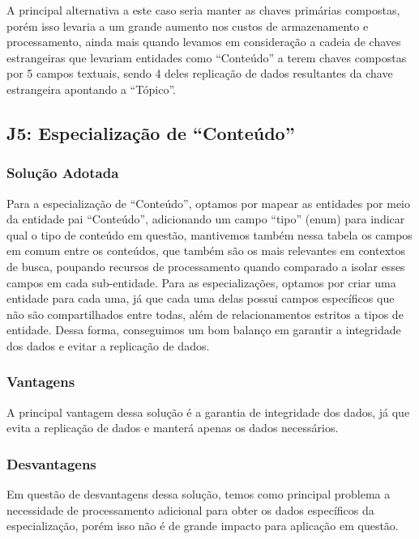 A principal alternativa a este caso seria manter as chaves primárias compostas,
porém isso levaria a um grande aumento nos custos de armazenamento e
processamento, ainda mais quando levamos em consideração a cadeia de chaves
estrangeiras que levariam entidades como ``Conteúdo'' a terem chaves compostas
por 5 campos textuais, sendo 4 deles replicação de dados resultantes da chave
estrangeira apontando a ``Tópico''.

\subsection{\textbf{J5:} Especialização de ``Conteúdo''}

\subsubsection{Solução Adotada}

Para a especialização de ``Conteúdo'', optamos por mapear as entidades por meio
da entidade pai ``Conteúdo'', adicionando um campo ``tipo'' (enum) para indicar
qual o tipo de conteúdo em questão, mantivemos também nessa tabela os campos em
comum entre os conteúdos, que também são os mais relevantes em contextos de
busca, poupando recursos de processamento quando comparado a isolar esses
campos em cada sub-entidade. Para as especializações, optamos por criar uma
entidade para cada uma, já que cada uma delas possui campos específicos que não
são compartilhados entre todas, além de relacionamentos estritos a tipos de
entidade. Dessa forma, conseguimos um bom balanço em garantir a integridade dos
dados e evitar a replicação de dados. 

\subsubsection{Vantagens}

A principal vantagem dessa solução é a garantia de integridade dos dados, já
que evita a replicação de dados e manterá apenas os dados necessários.

\subsubsection{Desvantagens}

Em questão de desvantagens dessa solução, temos como principal problema a
necessidade de processamento adicional para obter os dados específicos da
especialização, porém isso não é de grande impacto para aplicação em questão.

